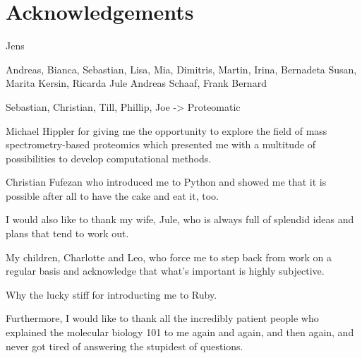 \cleardoublepage
\chapter*{Acknowledgements}

Jens

Andreas, Bianca, Sebastian, Lisa, 
Mia, Dimitris, Martin, Irina, Bernadeta
Susan, Marita
Kersin, Ricarda
Jule
Andreas Schaaf, Frank Bernard

Sebastian, Christian, Till, Phillip, Joe -> Proteomatic

Michael Hippler for giving me the opportunity to explore the field of
mass spectrometry-based proteomics which presented me with a multitude
of possibilities to develop computational methods.

Christian Fufezan who introduced me to Python and showed me that it is possible 
after all to have the cake and eat it, too.

I would also like to thank my wife, Jule, who is always full of splendid ideas
and plans that tend to work out.

My children, Charlotte and Leo, who force me to step back from work on a 
regular basis and acknowledge that what's important is highly subjective.

Why the lucky stiff for introducting me to Ruby.

Furthermore, I would like to thank all the incredibly patient people who 
explained the molecular biology 101 to me again and again, and then again,
and never got tired of answering the stupidest of questions.